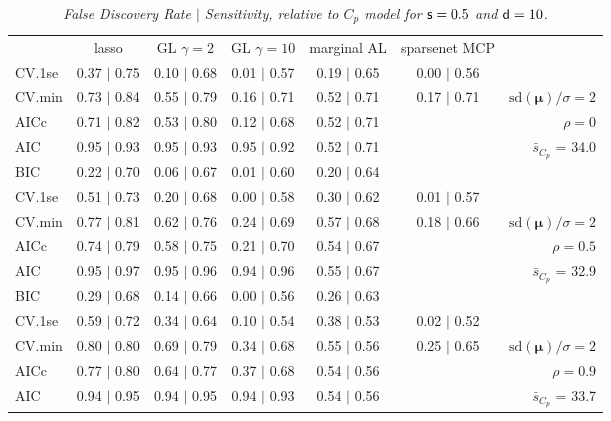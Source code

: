 \documentclass[12pt]{article}
\newcommand{\mr}[1]{\mathrm{#1}}
\newcommand{\bm}[1]{\mathbf{#1}}
\begin{document}
\begin{table}[p]\vspace{-.5cm}
\caption[l]{\label{sens}\it False Discovery Rate $\mid$ Sensitivity, relative to $C_p$ model  for ${\sf s}=0.5$ and ${\sf d}=10$.}
\vspace{-.5cm}
\small{}
\begin{center}
\begin{tabular}{l*{5}{c}|r}
 & lasso & GL $\gamma=2$ & GL $\gamma=10$ & marginal AL & sparsenet MCP  & \\
 \cline{1-7}
CV.1se & 0.37 $\mid$ 0.75 & 0.10 $\mid$ 0.68 & 0.01 $\mid$ 0.57 & 0.19 $\mid$ 0.65 & 0.00 $\mid$ 0.56 &\\
CV.min & 0.73 $\mid$ 0.84 & 0.55 $\mid$ 0.79 & 0.16 $\mid$ 0.71 & 0.52 $\mid$ 0.71 & 0.17 $\mid$ 0.71 &  $\mr{sd}(\bm{\mu})/\sigma=2$ \\
AICc & 0.71 $\mid$ 0.82 & 0.53 $\mid$ 0.80 & 0.12 $\mid$ 0.68 & 0.52 $\mid$ 0.71 & & $\rho=0$ \\
AIC & 0.95 $\mid$ 0.93 & 0.95 $\mid$ 0.93 & 0.95 $\mid$ 0.92 & 0.52 $\mid$ 0.71 & & \multirow{2}{*}{$\bar{s}_{C_p}$ = 34.0} \\
BIC & 0.22 $\mid$ 0.70 & 0.06 $\mid$ 0.67 & 0.01 $\mid$ 0.60 & 0.20 $\mid$ 0.64 & & \\
 \hline 
CV.1se & 0.51 $\mid$ 0.73 & 0.20 $\mid$ 0.68 & 0.00 $\mid$ 0.58 & 0.30 $\mid$ 0.62 & 0.01 $\mid$ 0.57 &\\
CV.min & 0.77 $\mid$ 0.81 & 0.62 $\mid$ 0.76 & 0.24 $\mid$ 0.69 & 0.57 $\mid$ 0.68 & 0.18 $\mid$ 0.66 &  $\mr{sd}(\bm{\mu})/\sigma=2$ \\
AICc & 0.74 $\mid$ 0.79 & 0.58 $\mid$ 0.75 & 0.21 $\mid$ 0.70 & 0.54 $\mid$ 0.67 & & $\rho=0.5$ \\
AIC & 0.95 $\mid$ 0.97 & 0.95 $\mid$ 0.96 & 0.94 $\mid$ 0.96 & 0.55 $\mid$ 0.67 & & \multirow{2}{*}{$\bar{s}_{C_p}$ = 32.9} \\
BIC & 0.29 $\mid$ 0.68 & 0.14 $\mid$ 0.66 & 0.00 $\mid$ 0.56 & 0.26 $\mid$ 0.63 & & \\
 \hline 
CV.1se & 0.59 $\mid$ 0.72 & 0.34 $\mid$ 0.64 & 0.10 $\mid$ 0.54 & 0.38 $\mid$ 0.53 & 0.02 $\mid$ 0.52 &\\
CV.min & 0.80 $\mid$ 0.80 & 0.69 $\mid$ 0.79 & 0.34 $\mid$ 0.68 & 0.55 $\mid$ 0.56 & 0.25 $\mid$ 0.65 &  $\mr{sd}(\bm{\mu})/\sigma=2$ \\
AICc & 0.77 $\mid$ 0.80 & 0.64 $\mid$ 0.77 & 0.37 $\mid$ 0.68 & 0.54 $\mid$ 0.56 & & $\rho=0.9$ \\
AIC & 0.94 $\mid$ 0.95 & 0.94 $\mid$ 0.95 & 0.94 $\mid$ 0.93 & 0.54 $\mid$ 0.56 & & \multirow{2}{*}{$\bar{s}_{C_p}$ = 33.7} \\

\end{tabular}
\end{center}
\end{table}
\end{document}
